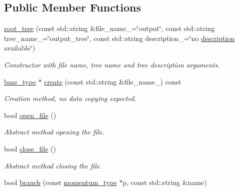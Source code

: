 \subsection*{Public Member Functions}
\begin{DoxyCompactItemize}
\item 
\hypertarget{a00481_a12096cd7504f2a1acc8ff7ded843558c}{}\hyperlink{a00481_a12096cd7504f2a1acc8ff7ded843558c}{root\+\_\+tree} (const std\+::string \&file\+\_\+name\+\_\+=\char`\"{}output\char`\"{}, const std\+::string tree\+\_\+name\+\_\+=\char`\"{}output\+\_\+tree\char`\"{}, const std\+::string description\+\_\+=\char`\"{}no \hyperlink{a00319_a366c2b2cfaa58182e2feebc1c30ce94c}{description} available\char`\"{})\label{a00481_a12096cd7504f2a1acc8ff7ded843558c}

\begin{DoxyCompactList}\small\item\em Constructor with file name, tree name and tree description arguments. \end{DoxyCompactList}\item 
\hypertarget{a00481_a2803c4cd8c150157c39f489f146ea1e4}{}\hyperlink{a00319}{base\+\_\+type} $\ast$ \hyperlink{a00481_a2803c4cd8c150157c39f489f146ea1e4}{create} (const std\+::string \&file\+\_\+name\+\_\+) const \label{a00481_a2803c4cd8c150157c39f489f146ea1e4}

\begin{DoxyCompactList}\small\item\em Creation method, no data copying expected. \end{DoxyCompactList}\item 
\hypertarget{a00481_ae29fa21f91261d513e1e71138ab7649f}{}bool \hyperlink{a00481_ae29fa21f91261d513e1e71138ab7649f}{open\+\_\+file} ()\label{a00481_ae29fa21f91261d513e1e71138ab7649f}

\begin{DoxyCompactList}\small\item\em Abstract method opening the file. \end{DoxyCompactList}\item 
\hypertarget{a00481_ab188c181eef370b5464d77409afc7a94}{}bool \hyperlink{a00481_ab188c181eef370b5464d77409afc7a94}{close\+\_\+file} ()\label{a00481_ab188c181eef370b5464d77409afc7a94}

\begin{DoxyCompactList}\small\item\em Abstract method closing the file. \end{DoxyCompactList}\item 
\hypertarget{a00481_a7be0744a790db35344e4f6342fa0c930}{}bool \hyperlink{a00481_a7be0744a790db35344e4f6342fa0c930}{branch} (const \hyperlink{a00579}{momentum\+\_\+type} $\ast$p, const std\+::string \&name)\label{a00481_a7be0744a790db35344e4f6342fa0c930}


\end{DoxyCompactItemize}
